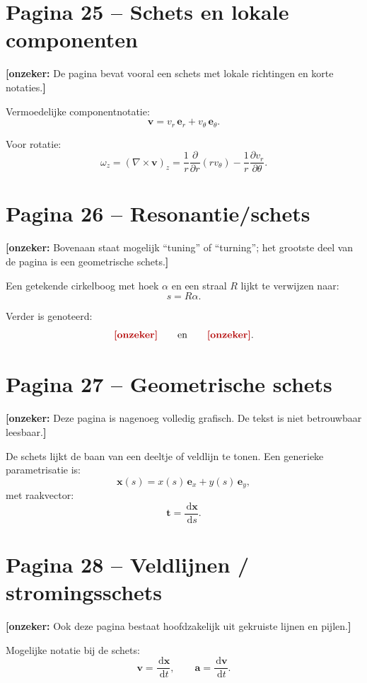 \documentclass[11pt,a4paper]{article}
\newcommand{\onzeker}[1]{\ifmmode\text{\color{red!70!black}\bfseries[onzeker]}\else\textcolor{red!70!black}{\textbf{[onzeker:} #1\textbf{]}}\fi}
\newcommand{\dd}{\,\mathrm{d}}
\newcommand{\p}{\partial}
\newcommand{\curl}{\nabla\times}
\begin{document}
\section*{Pagina 25 -- Schets en lokale componenten}

\onzeker{De pagina bevat vooral een schets met lokale richtingen en korte notaties.}

Vermoedelijke componentnotatie:
\[
    \mathbf{v}
    =
    v_r\,\mathbf{e}_r
    +
    v_\theta\,\mathbf{e}_\theta .
\]

Voor rotatie:
\[
    \omega_z
    =
    \left(\curl\mathbf{v}\right)_z
    =
    \frac{1}{r}\frac{\p}{\p r}\left(r v_\theta\right)
    -
    \frac{1}{r}\frac{\p v_r}{\p\theta}.
\]

\section*{Pagina 26 -- Resonantie/schets}

\onzeker{Bovenaan staat mogelijk ``tuning'' of ``turning''; het grootste deel van de pagina is een geometrische schets.}

Een getekende cirkelboog met hoek $\alpha$ en een straal $R$ lijkt te verwijzen naar:
\[
    s=R\alpha .
\]

Verder is genoteerd:
\[
    \onzeker{90^\circ}
    \qquad\text{en}\qquad
    \onzeker{A_r\ \text{of}\ A_\theta}.
\]

\section*{Pagina 27 -- Geometrische schets}

\onzeker{Deze pagina is nagenoeg volledig grafisch. De tekst is niet betrouwbaar leesbaar.}

De schets lijkt de baan van een deeltje of veldlijn te tonen. Een generieke parametrisatie is:
\[
    \mathbf{x}(s)
    =
    x(s)\,\mathbf{e}_x
    +
    y(s)\,\mathbf{e}_y ,
\]
met raakvector:
\[
    \mathbf{t}
    =
    \frac{\dd \mathbf{x}}{\dd s}.
\]

\section*{Pagina 28 -- Veldlijnen / stromingsschets}

\onzeker{Ook deze pagina bestaat hoofdzakelijk uit gekruiste lijnen en pijlen.}

Mogelijke notatie bij de schets:
\[
    \mathbf{v}
    =
    \frac{\dd \mathbf{x}}{\dd t},
    \qquad
    \mathbf{a}
    =
    \frac{\dd \mathbf{v}}{\dd t}.
\]
\end{document}
